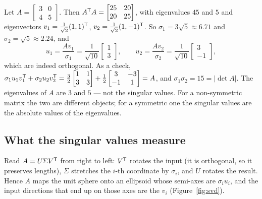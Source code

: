 \documentclass[11pt]{article}
\begin{document}
\begin{example}\label{ex:svd}
Let $A=\begin{bmatrix}3&0\\4&5\end{bmatrix}$. Then
$A^{\mathsf{T}} A=\begin{bmatrix}25&20\\20&25\end{bmatrix}$, with eigenvalues $45$ and $5$ and
eigenvectors $v_1=\tfrac{1}{\sqrt2}(1,1)^{\mathsf{T}}$, $v_2=\tfrac1{\sqrt2}(1,-1)^{\mathsf{T}}$. So
$\sigma_1=3\sqrt5\approx6.71$ and $\sigma_2=\sqrt5\approx2.24$, and
\[
   u_1=\frac{Av_1}{\sigma_1}=\frac{1}{\sqrt{10}}\begin{bmatrix}1\\3\end{bmatrix},\qquad
   u_2=\frac{Av_2}{\sigma_2}=\frac{1}{\sqrt{10}}\begin{bmatrix}3\\-1\end{bmatrix},
\]
which are indeed orthogonal. As a check,
$\sigma_1u_1v_1^{\mathsf{T}}+\sigma_2u_2v_2^{\mathsf{T}}=\tfrac32\begin{bmatrix}1&1\\3&3\end{bmatrix}
+\tfrac12\begin{bmatrix}3&-3\\-1&1\end{bmatrix}=A$, and
$\sigma_1\sigma_2=15=|\det A|$. The eigenvalues of $A$ are $3$ and $5$ --- not the
singular values. For a non-symmetric matrix the two are different objects; for a
symmetric one the singular values are the absolute values of the eigenvalues.
\end{example}

\subsection{What the singular values measure}\label{sec:svduse}
Read $A=U\Sigma V^{\mathsf{T}}$ from right to left: $V^{\mathsf{T}}$ rotates the input (it is
orthogonal, so it preserves lengths), $\Sigma$ stretches the $i$-th coordinate by
$\sigma_i$, and $U$ rotates the result. Hence $A$ maps the unit sphere onto an
ellipsoid whose semi-axes are $\sigma_iu_i$, and the input directions that end up
on those axes are the $v_i$ (Figure~\ref{fig:svd}).
\end{document}
